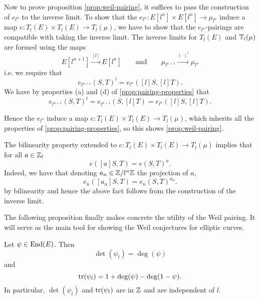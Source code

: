 Now to prove proposition \ref{prop:weil-pairing}, it suffices to pass the 
construction of $e_{l^n}$ to the inverse limit.
To show that the $e_{l^n}: E[l^n]\times E[l^n] \to \mu_{l^n}$ induce a map 
$e: T_l(E) \times T_l(E) \to T_l(\mu)$, we have to show that the
$e_{l^n}$-pairings are compatible with taking the inverse limit.
The inverse limits for $T_l(E)$ and $\mathbb{T}_l(\mu)$ are formed using the maps
\begin{equation*}
	E[l^{n+1}]\xrightarrow{[l]}E[l^n]
	\qquad\textrm{and}\qquad
	\mu_{l^{n+1}}\xrightarrow{(\cdot)^l}\mu_{l^n}
\end{equation*}
i.e.
we require that
\begin{equation*}
	e_{l^{n+1}}(S, T)^l = e_{l^n}([l]S, [l]T).	
\end{equation*}
We have by properties (a) and (d) of \ref{prop:pairing-properties} that
\begin{equation*}
	e_{l^{n+1}}(S, T)^l = e_{l^{n+1}}(S, [l]T) = e_{l^n}([l]S, [l]T).
\end{equation*}

Hence the $e_{l^n}$ induce a map $e:T_l(E)\times T_l(E) \to T_l(\mu)$,
which inherits all the properties of \ref{prop:pairing-properties},
so this shows \ref{prop:weil-pairing}.

\begin{remark}
	The bilinearity property extended to $e:T_l(E)\times T_l(E) \to T_l(\mu)$
	implies that for all $a \in \mathbb{Z}_l$
	\begin{equation*}
		e([a]S, T) = e(S, T)^a.
	\end{equation*}
	Indeed, we have that denoting $a_n \in \mathbb{Z}/l^n\mathbb{Z}$ the projection of $a$,
	\begin{equation*}
		e_n([a_n]S, T) = e_n(S, T)^{a_n}.
	\end{equation*}
	by bilinearity and hence the above fact follows from the construction
	of the inverse limit.
\end{remark}


The following proposition finally makes concrete the
utility of the Weil pairing. It will serve as the main tool for showing
the Weil conjectures for elliptic curves.

\begin{proposition}
	\label{prop:deg-tr-det}
	Let $\psi \in \operatorname{End}(E)$. Then
	\begin{equation*}
		\det(\psi_l) = \deg(\psi)
	\end{equation*}
	and
	\begin{equation*}
		\operatorname{tr}(\psi_l) = 1 + \deg(\psi) - \deg(1 - \psi).
	\end{equation*}
	In particular, $\det(\psi_l)$ and $\operatorname{tr}(\psi_l)$ are in $\mathbb{Z}$
	and are independent of $l$.
\end{proposition}

